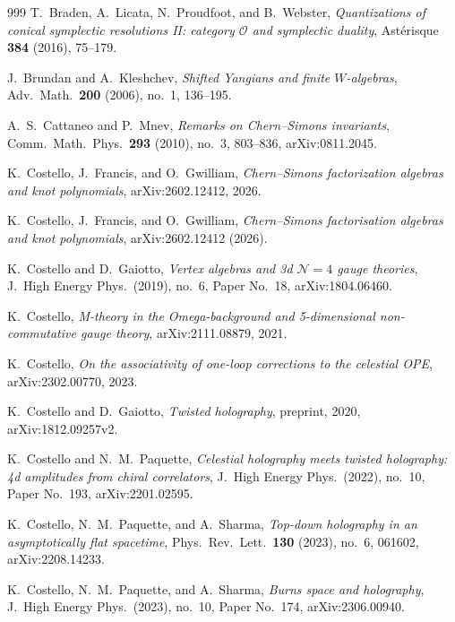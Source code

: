 \documentclass[11pt]{memoir}
\begin{document}
\begin{thebibliography}{999}
T.~Braden, A.~Licata, N.~Proudfoot, and B.~Webster, \emph{Quantizations of conical symplectic resolutions II: category $\mathcal{O}$ and symplectic duality}, Ast\'erisque \textbf{384} (2016), 75--179.

J.~Brundan and A.~Kleshchev, \emph{Shifted Yangians and finite $W$-algebras}, Adv.\ Math.\ \textbf{200} (2006), no.~1, 136--195.

A.~S.~Cattaneo and P.~Mnev, \emph{Remarks on Chern--Simons invariants}, Comm.\ Math.\ Phys.\ \textbf{293} (2010), no.~3, 803--836, arXiv:0811.2045.

K.~Costello, J.~Francis, and O.~Gwilliam, \emph{Chern--Simons factorization algebras and knot polynomials}, arXiv:2602.12412, 2026.

 K.~Costello, J.~Francis, and O.~Gwilliam, \emph{Chern--Simons factorisation algebras and knot polynomials}, arXiv:2602.12412 (2026).

K.~Costello and D.~Gaiotto, \emph{Vertex algebras and 3d $\mathcal{N}=4$ gauge theories}, J.\ High Energy Phys.\ (2019), no.~6, Paper No.~18, arXiv:1804.06460.

K.~Costello, \emph{M-theory in the Omega-background and 5-dimensional non-commutative gauge theory}, arXiv:2111.08879, 2021.

K.~Costello, \emph{On the associativity of one-loop corrections to the celestial OPE}, arXiv:2302.00770, 2023.

K.~Costello and D.~Gaiotto, \emph{Twisted holography}, preprint, 2020, arXiv:1812.09257v2.

K.~Costello and N.~M.~Paquette, \emph{Celestial holography meets twisted holography: 4d amplitudes from chiral correlators}, J.\ High Energy Phys.\ (2022), no.~10, Paper No.~193, arXiv:2201.02595.

K.~Costello, N.~M.~Paquette, and A.~Sharma, \emph{Top-down holography in an asymptotically flat spacetime}, Phys.\ Rev.\ Lett.\ \textbf{130} (2023), no.~6, 061602, arXiv:2208.14233.

K.~Costello, N.~M.~Paquette, and A.~Sharma, \emph{Burns space and holography}, J.\ High Energy Phys.\ (2023), no.~10, Paper No.~174, arXiv:2306.00940.


\end{thebibliography}
\end{document}
